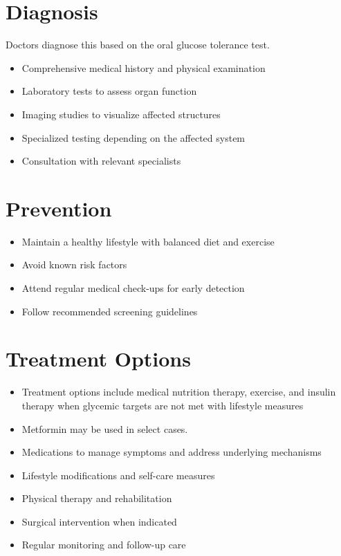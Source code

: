 \section{Diagnosis}
Doctors diagnose this based on the oral glucose tolerance test.

\begin{itemize}[noitemsep]
  \item Comprehensive medical history and physical examination
  \item Laboratory tests to assess organ function
  \item Imaging studies to visualize affected structures
  \item Specialized testing depending on the affected system
  \item Consultation with relevant specialists
\end{itemize}
\section{Prevention}
\begin{itemize}[noitemsep]
  \item Maintain a healthy lifestyle with balanced diet and exercise
  \item Avoid known risk factors
  \item Attend regular medical check-ups for early detection
  \item Follow recommended screening guidelines
\end{itemize}
\section{Treatment Options}
\begin{itemize}[noitemsep]
  \item Treatment options include medical nutrition therapy, exercise, and insulin therapy when glycemic targets are not met with lifestyle measures
  \item Metformin may be used in select cases.
  \item Medications to manage symptoms and address underlying mechanisms
  \item Lifestyle modifications and self-care measures
  \item Physical therapy and rehabilitation
  \item Surgical intervention when indicated
  \item Regular monitoring and follow-up care
\end{itemize}

